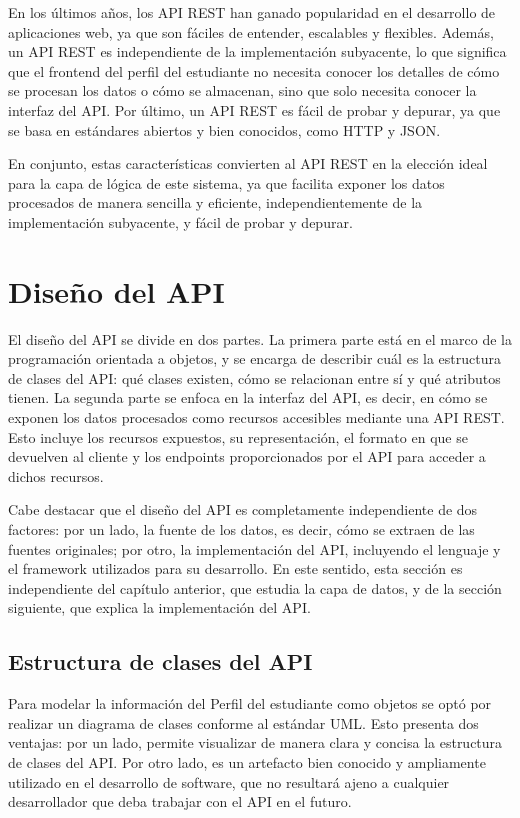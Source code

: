 En los últimos años, los \gls{API REST} han ganado popularidad en el desarrollo de aplicaciones web, ya que son fáciles de entender, escalables y flexibles. Además, un \gls{API REST} es independiente de la implementación subyacente, lo que significa que el frontend del perfil del estudiante no necesita conocer los detalles de cómo se procesan los datos o cómo se almacenan, sino que solo necesita conocer la interfaz del \gls{API}. Por último, un \gls{API REST} es fácil de probar y depurar, ya que se basa en estándares abiertos y bien conocidos, como \gls{HTTP} y \gls{JSON}.

En conjunto, estas características convierten al \gls{API REST} en la elección ideal para la capa de lógica de este sistema, ya que facilita exponer los datos procesados de manera sencilla y eficiente, independientemente de la implementación subyacente, y fácil de probar y depurar.

\section{Diseño del API}

El diseño del \gls{API} se divide en dos partes. La primera parte está en el marco de la programación orientada a objetos, y se encarga de describir cuál es la estructura de clases del \gls{API}: qué clases existen, cómo se relacionan entre sí y qué atributos tienen. La segunda parte se enfoca en la interfaz del \gls{API}, es decir, en cómo se exponen los datos procesados como recursos accesibles mediante una \gls{API REST}. Esto incluye los recursos expuestos, su representación, el formato en que se devuelven al cliente y los endpoints proporcionados por el \gls{API} para acceder a dichos recursos.

Cabe destacar que el diseño del \gls{API} es completamente independiente de dos factores: por un lado, la fuente de los datos, es decir, cómo se extraen de las fuentes originales; por otro, la implementación del \gls{API}, incluyendo el lenguaje y el framework utilizados para su desarrollo. En este sentido, esta sección es independiente del capítulo anterior, que estudia la capa de datos, y de la sección siguiente, que explica la implementación del \gls{API}.

\subsection{Estructura de clases del API}

Para modelar la información del Perfil del estudiante como objetos se optó por realizar un diagrama de clases conforme al estándar \gls{UML}. Esto presenta dos ventajas: por un lado, permite visualizar de manera clara y concisa la estructura de clases del \gls{API}. Por otro lado, es un artefacto bien conocido y ampliamente utilizado en el desarrollo de software, que no resultará ajeno a cualquier desarrollador que deba trabajar con el \gls{API} en el futuro.


